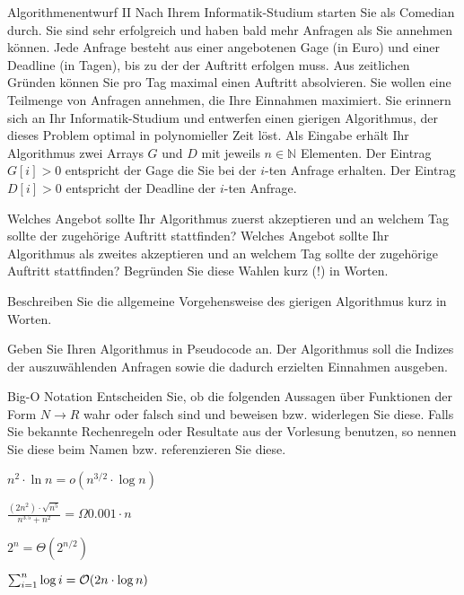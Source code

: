 \documentclass{exercisesheet}
\begin{document}
\begin{eexercises}{Algorithmenentwurf II}{
    Nach Ihrem Informatik-Studium starten Sie als Comedian durch. Sie sind sehr erfolgreich und haben bald mehr Anfragen als Sie annehmen können. Jede Anfrage besteht aus einer angebotenen Gage (in Euro) und einer Deadline (in Tagen), bis zu der der Auftritt erfolgen muss. Aus zeitlichen Gründen können Sie pro Tag maximal einen Auftritt absolvieren. Sie wollen eine Teilmenge von Anfragen annehmen, die Ihre Einnahmen maximiert. Sie erinnern sich an Ihr Informatik-Studium und entwerfen einen gierigen Algorithmus, der dieses Problem optimal in polynomieller Zeit löst. Als Eingabe erhält Ihr Algorithmus zwei Arrays $G$ und $D$ mit jeweils $n \in \mathbb{N}$ Elementen. Der Eintrag $G[i] > 0$ entspricht der Gage die Sie bei der $i$-ten Anfrage erhalten. Der Eintrag $D[i] > 0$ entspricht der Deadline der $i$-ten Anfrage.
  }
  \item Welches Angebot sollte Ihr Algorithmus zuerst akzeptieren und an welchem Tag sollte der zugehörige Auftritt stattfinden? Welches Angebot sollte Ihr Algorithmus als zweites akzeptieren und an welchem Tag sollte der zugehörige Auftritt stattfinden? Begründen Sie diese Wahlen kurz (!) in Worten.
  \item Beschreiben Sie die allgemeine Vorgehensweise des gierigen Algorithmus kurz in Worten.
  \item Geben Sie Ihren Algorithmus in Pseudocode an. Der Algorithmus soll die Indizes der auszuwählenden Anfragen sowie die dadurch erzielten Einnahmen ausgeben.
\end{eexercises}



\begin{eexercises}{Big-O Notation}{
    Entscheiden Sie, ob die folgenden Aussagen über Funktionen der Form $N \to R$ wahr oder falsch sind und beweisen bzw. widerlegen Sie diese. Falls Sie bekannte Rechenregeln oder Resultate aus der Vorlesung benutzen, so nennen Sie diese beim Namen bzw. referenzieren Sie diese.
  }
  \item $n^2\cdot \ln{n} = o(n^{3/2}\cdot \log{n})$
  \item $\frac{(2n^2)\cdot \sqrt{n^5}}{n^{3.5}+n^2} = \Omega{0.001\cdot n}$
  \item $2^n = \Theta(2^{n/2})$
  \item $\sum_{i=1}^n \log{i} = \mathcal{O}(2n\cdot \log{n})$
\end{eexercises}
\end{document}
